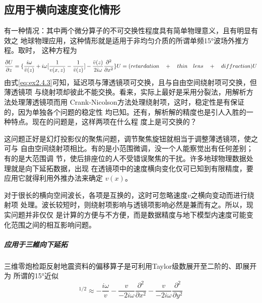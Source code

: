 \subsection{应用于横向速度变化情形}
\label{sec:2.4.4}
有一种情况：其中两个微分算子的不可交换性程度具有简单物理意义，且有明显有效之
地球物理应用，这种情形就是适用于非均匀介质的所谓单频15°波场外推方程。取时，
这种方程为
\begin{equation}
\frac{\partial U}{\partial z}=\{\frac{i\omega}{\bar{v}(z)}+i\omega
[\frac{1}{v(x,z)}-\frac{1}{\bar{v}(z)}]-\frac{\bar{v}(z)}{2i\omega}
\frac{\partial^2}{\partial x^2}\}U\\
=(retardation\quad + \quad thin\quad lens\quad +\quad diffraction)U
\label{eq:ex2.4.3}
\end{equation}
由式\ref{eq:ex2.4.3}可知，延迟项与薄透镜项可交换，且与自由空间绕射项可交换，但薄透镜项
与绕射项却彼此不能交换。看来，实际上最好是采用分裂法，用解析方法处理薄透镜项而用
Crank-Nicolson方法处理绕射项，这时，稳定性是有保证的，因为单独各个问题的稳定性
均已知。还有，解析解的精度也是引人入胜的一种特点。现在的问题是，这样两项在什么程
度上是可交换的？

这问题正好是幻灯投影仪的聚焦问题，调节聚焦旋钮就相当于调整薄透镜项，使之可与
自由空间绕射项相比。有的是小范围微调，没一个人能察觉出有任何差别；有的是大范围调
节，使后排座位的人不受错误聚焦的干扰。许多地球物理数据处理就是向下延拓数据，出现
在透镜项中的速度横向变化仅可已知到有限精度，要应用它就得利用外推办法来确定
$v(x)$。

对于很长的横向空间波长，各项是互换的，这时可忽略速度$v$之横向变动而进行绕射项
处理。波长较短时，则绕射项影响与透镜项影响必然是兼而有之。所以，现实问题并非仅仅
是计算的方便与不方便，而是数据精度与地下模型内速度可能变化范围之间的相互影响问题。

\subparagraph{应用于三維向下延拓}
\label{sec:2.4.5}

三维零炮检距反射地震资料的偏移算子是可利用Taylor级数展开至二阶的、即展开为
所谓的15°近似
\begin{equation}
[\frac{(-i\omega)^2}{v^2}-\frac{\partial^2}{\partial x^2}-\frac{\partial^2}{\partial y^2}]^{1/2}
\approx -\frac{i\omega}{v}-\frac{v}{-2i\omega}\frac{\partial^2}{\partial x^2}-\frac{v}{-2i\omega}\frac{\partial^2}{\partial y^2}
\label{eq:ex2.4.4}
\end{equation}
